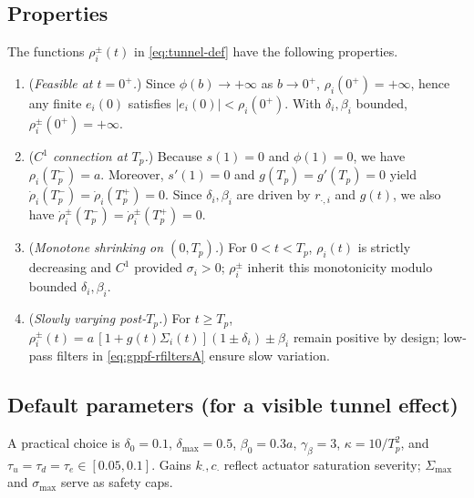 \documentclass[pdflatex,sn-mathphys-num]{sn-jnl}%
\theoremstyle{thmstyleone}%
\theoremstyle{thmstyletwo}%
\theoremstyle{thmstylethree}%
\begin{document}
\subsection*{Properties}
The functions $\rho_i^\pm(t)$ in \eqref{eq:tunnel-def} have the following properties.
\begin{enumerate}[label=(\roman*)]
\item (\emph{Feasible at $t=0^+$.}) Since $\phi(b)\to+\infty$ as $b\to0^+$, $\rho_i(0^+)=+\infty$, hence any finite $e_i(0)$ satisfies $|e_i(0)|<\rho_i(0^+)$. With $\delta_i,\beta_i$ bounded, $\rho_i^\pm(0^+)=+\infty$.
\item (\emph{$C^1$ connection at $T_p$.}) Because $s(1)=0$ and $\phi(1)=0$, we have $\rho_i(T_p^-)=a$. Moreover, $s'(1)=0$ and $g(T_p)=g'(T_p)=0$ yield $\dot\rho_i(T_p^-)=\dot\rho_i(T_p^+)=0$. Since $\delta_i,\beta_i$ are driven by $r_{\cdot,i}$ and $g(t)$, we also have $\dot\rho_i^\pm(T_p^-)=\dot\rho_i^\pm(T_p^+)=0$.
\item (\emph{Monotone shrinking on $(0,T_p)$.}) For $0<t<T_p$, $\rho_i(t)$ is strictly decreasing and $C^1$ provided $\sigma_i>0$; $\rho_i^\pm$ inherit this monotonicity modulo bounded $\delta_i,\beta_i$.
\item (\emph{Slowly varying post-$T_p$.}) For $t\ge T_p$, $\rho_i^\pm(t)=a\,[1+g(t)\Sigma_i(t)](1\pm\delta_i)\pm\beta_i$ remain positive by design; low-pass filters in \eqref{eq:gppf-rfiltersA} ensure slow variation.
\end{enumerate}

\subsection*{Default parameters (for a visible tunnel effect)}
A practical choice is $\delta_0=0.1$, $\delta_{\max}=0.5$, $\beta_0=0.3a$, $\gamma_\beta=3$, $\kappa=10/T_p^2$, and $\tau_u=\tau_d=\tau_e\in[0.05,0.1]$. Gains $k_\cdot,c_\cdot$ reflect actuator saturation severity; $\Sigma_{\max}$ and $\sigma_{\max}$ serve as safety caps.




















% 
% 

% 
\end{document}
